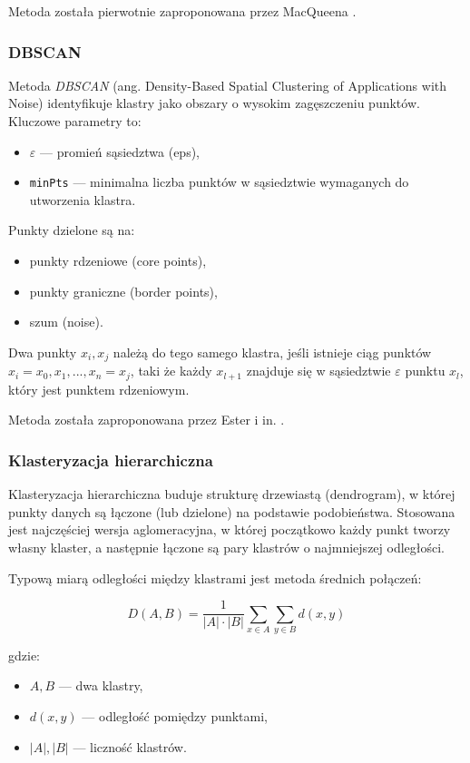 \documentclass[a4paper,12pt,titlepage]{article}
\begin{document}
Metoda została pierwotnie zaproponowana przez MacQueena \cite{macqueen1967}.

\subsubsection{DBSCAN}

Metoda \textit{DBSCAN} (ang. Density-Based Spatial Clustering of Applications with Noise) identyfikuje klastry jako obszary o wysokim zagęszczeniu punktów. Kluczowe parametry to:
\begin{itemize}
    \item \( \varepsilon \) — promień sąsiedztwa (eps),
    \item \texttt{minPts} — minimalna liczba punktów w sąsiedztwie wymaganych do utworzenia klastra.
\end{itemize}

Punkty dzielone są na:
\begin{itemize}
    \item punkty rdzeniowe (core points),
    \item punkty graniczne (border points),
    \item szum (noise).
\end{itemize}

Dwa punkty \( x_i, x_j \) należą do tego samego klastra, jeśli istnieje ciąg punktów \( x_i = x_0, x_1, ..., x_n = x_j \), taki że każdy \( x_{l+1} \) znajduje się w sąsiedztwie \( \varepsilon \) punktu \( x_l \), który jest punktem rdzeniowym.

Metoda została zaproponowana przez Ester i in. \cite{ester1996}.

\subsubsection{Klasteryzacja hierarchiczna}

Klasteryzacja hierarchiczna buduje strukturę drzewiastą (dendrogram), w której punkty danych są łączone (lub dzielone) na podstawie podobieństwa. Stosowana jest najczęściej wersja aglomeracyjna, w której początkowo każdy punkt tworzy własny klaster, a następnie łączone są pary klastrów o najmniejszej odległości.

Typową miarą odległości między klastrami jest metoda średnich połączeń:

\[
D(A, B) = \frac{1}{|A| \cdot |B|} \sum_{x \in A} \sum_{y \in B} d(x, y)
\]

gdzie:
\begin{itemize}
    \item \( A, B \) — dwa klastry,
    \item \( d(x, y) \) — odległość pomiędzy punktami,
    \item \( |A|, |B| \) — liczność klastrów.
\end{itemize}
\end{document}
